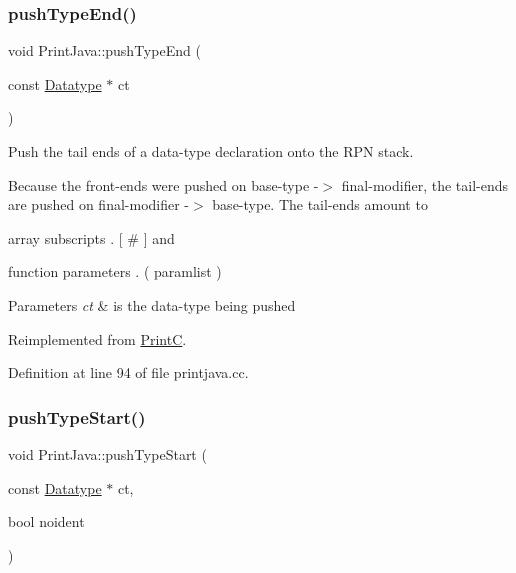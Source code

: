 \subsubsection{\texorpdfstring{pushTypeEnd()}{pushTypeEnd()}}
{\footnotesize\ttfamily void Print\+Java\+::push\+Type\+End (\begin{DoxyParamCaption}\item[{const \mbox{\hyperlink{class_datatype}{Datatype}} $\ast$}]{ct }\end{DoxyParamCaption})\hspace{0.3cm}{\ttfamily [virtual]}}



Push the tail ends of a data-\/type declaration onto the R\+PN stack. 

Because the front-\/ends were pushed on base-\/type -\/$>$ final-\/modifier, the tail-\/ends are pushed on final-\/modifier -\/$>$ base-\/type. The tail-\/ends amount to
\begin{DoxyItemize}
\item array subscripts . \mbox{[} \# \mbox{]} and
\item function parameters . ( paramlist )
\end{DoxyItemize}


\begin{DoxyParams}{Parameters}
{\em ct} & is the data-\/type being pushed \\
\hline
\end{DoxyParams}


Reimplemented from \mbox{\hyperlink{class_print_c_a45d0e43f9f4e91353db9aeb4c053deaa}{PrintC}}.



Definition at line 94 of file printjava.\+cc.

\mbox{\label{class_print_java_af82e5ca143891ea052778b1ed234d3e0}} 
\subsubsection{\texorpdfstring{pushTypeStart()}{pushTypeStart()}}
{\footnotesize\ttfamily void Print\+Java\+::push\+Type\+Start (\begin{DoxyParamCaption}\item[{const \mbox{\hyperlink{class_datatype}{Datatype}} $\ast$}]{ct,  }\item[{bool}]{noident }\end{DoxyParamCaption})\hspace{0.3cm}{\ttfamily [virtual]}}

